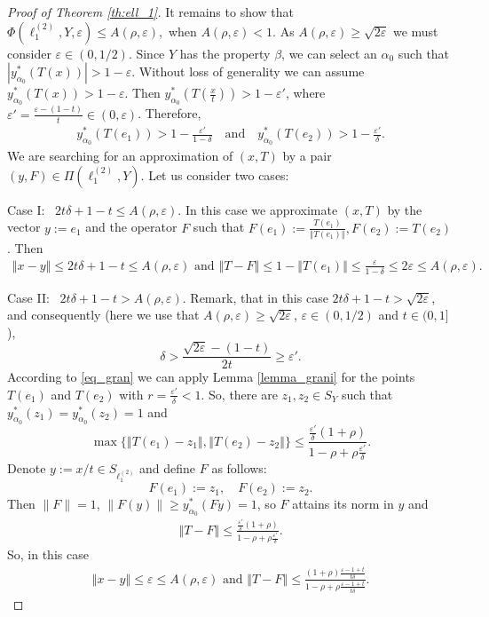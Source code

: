 \documentclass[11pt,a4paper]{amsart}
\newcommand{\eps}{\varepsilon}
\newcommand{\norm}[1]{\left\Vert#1\right\Vert}
\numberwithin{equation}{section}
\theoremstyle{plain}
\theoremstyle{definition}
\renewcommand{\leq}{\leqslant}
\renewcommand{\geq}{\geqslant}
\renewcommand{\le}{\leqslant}
\renewcommand{\ge}{\geqslant}
\begin{document}
\begin{proof}[Proof of Theorem \ref{th:ell_1}]
It remains to show that $\Phi(\ell^{(2)}_1,Y,\varepsilon)\leq A(\rho, \eps),$ when $A(\rho, \eps)< 1$. As  $A(\rho, \eps)\geq\sqrt{2\eps}$ we must consider $\eps\in(0, 1/2)$.  Since $Y$ has the property $\beta$, we can select an $\alpha_0$ such that $|y^*_{\alpha_0}(T(x))|> 1-\eps$. Without loss of generality we can assume $y^*_{\alpha_0}(T(x))> 1-\eps$. Then  $y^*_{\alpha_0}\left(T\left(\frac{x}{t}\right)\right)> 1-\eps'$, where $\eps'=\frac{\eps-(1-t)}{t}\in(0, \eps)$. 
Therefore, 
\begin{align}\label{eq_gran}
y^*_{\alpha_0}(T(e_1))> 1-\frac{\eps'}{1-\delta} \quad 
\text{and}\quad y^*_{\alpha_0}(T(e_2)) > 1-\frac{\eps'}{\delta}.
\end{align}
 We are searching for an approximation of $(x, T)$ by a pair $(y, F)\in \Pi(\ell_1^{(2)}, Y)$. Let us consider two cases:

Case I:  \, $2t\delta+1-t \le A(\rho, \eps)$. In this case we approximate $(x, T)$ by the vector $y:=e_1$ and the operator $F$ such that $F(e_1):=\frac{T(e_1)}{\norm{T(e_1)}}, F(e_2):=T(e_2)$. Then
\begin{align*}
\norm{x-y}\leq 2t\delta+1-t \le A(\rho, \eps)\,\, \text{and}\,\, \norm{T-F}\leq 1- \norm{T(e_1)}\leq \frac{\eps}{1-\delta}\leq 2\eps\leq A(\rho, \eps).
\end{align*} 


Case II:  \, $2t\delta+1-t > A(\rho, \eps)$. Remark, that in this case 
$2t\delta+1-t >  \sqrt{2\eps}$, and consequently (here we use that  $A(\rho, \eps)\geq\sqrt{2\eps}$,  $\eps\in(0, 1/2)$ and $t \in (0, 1]$),
$$
\delta > \frac{\sqrt{2\eps} - (1 - t)}{2t} \ge \eps'.
$$
 According to \eqref{eq_gran} we can apply Lemma \ref{lemma_grani} for the points $T(e_1)$ and $T(e_2)$ with $r=\frac{\eps'}{\delta} < 1$. 
So, there are $z_1, z_2\in S_Y$ such that $y^*_{\alpha_0}(z_1)=y^*_{\alpha_0}(z_2)=1$ and 
$$ \max\{\norm{T(e_1)-z_1}, \norm{T(e_2)-z_2}\}\leq \frac{\frac{\eps'}{\delta}(1+\rho)}{1-\rho +\rho \frac{\eps'}{\delta}}.$$
Denote $y:=x/t \in S_{\ell_1^{(2)}}$ and define $F$ as follows:
$$F(e_1):=z_1, \quad F(e_2):=z_2.$$
Then $\|F\| = 1$, $\|F(y)\|  \ge y^*_{\alpha_0}(Fy) = 1$, so $F$ attains its norm in  $y$ and 
\begin{align*}
\norm{T-F}\leq \frac{\frac{\eps'}{\delta}(1+\rho)}{1-\rho +\rho \frac{\eps'}{\delta}}.
\end{align*}
So, in this case
\begin{align*}
\norm{x-y}\leq \eps\leq A(\rho, \eps)\,\, \text{and}\,\, \norm{T-F}\leq \frac{(1+\rho)\frac{\eps-1+t}{t\delta}}{1-\rho+\rho\frac{\eps-1+t}{t\delta}}.
\end{align*}


\end{proof}
\end{document}
